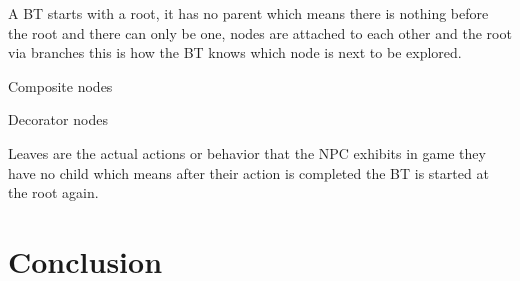\documentclass{scrartcl}
\begin{document}
A BT starts with a root, it has no parent which means there is nothing before the root and there can only be one, nodes are attached to each other and the root via branches this is how the BT knows which node is next to be explored.

Composite nodes

Decorator nodes

Leaves are the actual actions or behavior that the NPC exhibits in game they have no child which means after their action is completed the BT is started at the root again\cite{marzinotto2014towards}.

\section{Conclusion}

 \cite{youtube} \cite{UE4} \cite{nicolau2016evolutionary} \cite{nareyek2004ai} 



\end{document}
